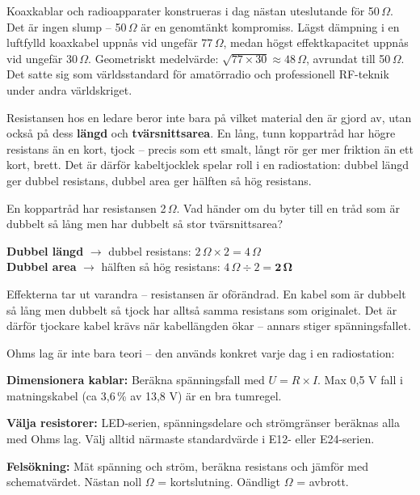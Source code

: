 \documentclass[a4paper,11pt,twoside]{book}
\begin{document}
Koaxkablar och radioapparater konstrueras i dag nästan uteslutande för 50\,$\Omega$. Det är ingen slump – 50\,$\Omega$ är en genomtänkt kompromiss. Lägst dämpning i en luftfylld koaxkabel uppnås vid ungefär 77\,$\Omega$, medan högst effektkapacitet uppnås vid ungefär 30\,$\Omega$. Geometriskt medelvärde: $\sqrt{77 \times 30} \approx 48\,\Omega$, avrundat till 50\,$\Omega$. Det satte sig som världsstandard för amatörradio och professionell RF-teknik under andra världskriget.

Resistansen hos en ledare beror inte bara på vilket material den är gjord av, utan också på dess \textbf{längd} och \textbf{tvärsnittsarea}. En lång, tunn koppartråd har högre resistans än en kort, tjock – precis som ett smalt, långt rör ger mer friktion än ett kort, brett. Det är därför kabeltjocklek spelar roll i en radiostation: dubbel längd ger dubbel resistans, dubbel area ger hälften så hög resistans.

\begin{worked}[title={Räkneexempel 1.2.2-1 – Resistans och geometri}]
En koppartråd har resistansen 2\,$\Omega$. Vad händer om du byter 
till en tråd som är dubbelt så lång men har dubbelt så stor 
tvärsnittsarea?

\textbf{Dubbel längd} $\rightarrow$ dubbel resistans: 
$2\,\Omega \times 2 = 4\,\Omega$\\
\textbf{Dubbel area} $\rightarrow$ hälften så hög resistans: 
$4\,\Omega \div 2 = \mathbf{2\,\Omega}$

Effekterna tar ut varandra – resistansen är oförändrad. En kabel 
som är dubbelt så lång men dubbelt så tjock har alltså samma 
resistans som originalet. Det är därför tjockare kabel krävs när 
kabellängden ökar – annars stiger spänningsfallet.
\end{worked}

\newpage

Ohms lag är inte bara teori – den används konkret varje dag i en 
radiostation:

\textbf{Dimensionera kablar:} Beräkna spänningsfall med $U = R \times I$. Max 0,5 V fall i matningskabel (ca 3,6\,\% av 13,8 V) är en bra tumregel.

\textbf{Välja resistorer:} LED-serien, spänningsdelare och strömgränser beräknas alla med Ohms lag. Välj alltid närmaste standardvärde i E12- eller E24-serien.

\textbf{Felsökning:} Mät spänning och ström, beräkna resistans och jämför med schematvärdet. Nästan noll $\Omega$ = kortslutning. Oändligt $\Omega$ = avbrott.
\end{document}
